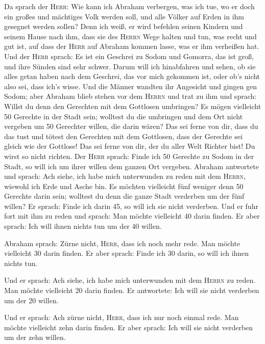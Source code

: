  Da sprach der \textsc{Herr}: Wie kann ich Abraham
verbergen, was ich tue,  wo er doch ein großes und
mächtiges Volk werden soll, und alle Völker auf Erden in ihm gesegnet
werden sollen?  Denn ich weiß, er wird befehlen seinen
Kindern und seinem Hause nach ihm, dass sie des \textsc{Herrn} Wege
halten und tun, was recht und gut ist, auf dass der \textsc{Herr} auf
Abraham kommen lasse, was er ihm verheißen hat.  Und der
\textsc{Herr} sprach: Es ist ein Geschrei zu Sodom und Gomorra, das ist
groß, und ihre Sünden sind sehr schwer.  Darum will ich
hinabfahren und sehen, ob sie alles getan haben nach dem Geschrei, das
vor mich gekommen ist, oder ob's nicht also sei, dass ich's wisse.
 Und die Männer wandten ihr Angesicht und gingen gen
Sodom; aber Abraham blieb stehen vor dem \textsc{Herrn} 
und trat zu ihm und sprach: Willst du denn den Gerechten mit dem
Gottlosen umbringen?  Es mögen vielleicht 50 Gerechte in
der Stadt sein; wolltest du die umbringen und dem Ort nicht vergeben um
50 Gerechter willen, die darin wären?  Das sei ferne von
dir, dass du das tust und tötest den Gerechten mit dem Gottlosen, dass
der Gerechte sei gleich wie der Gottlose! Das sei ferne von dir, der du
aller Welt Richter bist! Du wirst so nicht richten.  Der
\textsc{Herr} sprach: Finde ich 50 Gerechte zu Sodom in der Stadt, so
will ich um ihrer willen dem ganzen Ort vergeben. 
Abraham antwortete und sprach: Ach siehe, ich habe mich unterwunden zu
reden mit dem \textsc{Herrn}, wiewohl ich Erde und Asche bin.
 Es möchten vielleicht fünf weniger denn 50 Gerechte
darin sein; wolltest du denn die ganze Stadt verderben um der fünf
willen? Er sprach: Finde ich darin 45, so will ich sie nicht verderben.
 Und er fuhr fort mit ihm zu reden und sprach: Man möchte
vielleicht 40 darin finden. Er aber sprach: Ich will ihnen nichts tun um
der 40 willen.

 Abraham sprach: Zürne nicht, \textsc{Herr}, dass ich
noch mehr rede. Man möchte vielleicht 30 darin finden. Er aber sprach:
Finde ich 30 darin, so will ich ihnen nichts tun.

 Und er sprach: Ach siehe, ich habe mich unterwunden mit
dem \textsc{Herrn} zu reden. Man möchte vielleicht 20 darin finden. Er
antwortete: Ich will sie nicht verderben um der 20 willen.

 Und er sprach: Ach zürne nicht, \textsc{Herr}, dass ich
nur noch einmal rede. Man möchte vielleicht zehn darin finden. Er aber
sprach: Ich will sie nicht verderben um der zehn willen.

